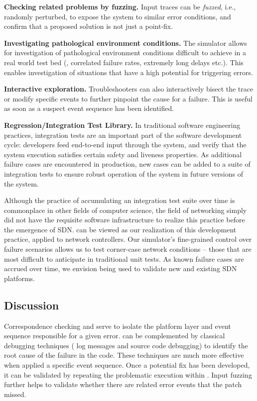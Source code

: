 \noindent\textbf{Checking related problems by fuzzing.} Input traces can be \emph{fuzzed}, i.e.,
randomly perturbed, to expose the system to similar error conditions, and confirm
that a proposed solution is not just a point-fix.

\noindent\textbf{Investigating pathological environment conditions.} The simulator allows for investigation
of pathological environment conditions difficult to achieve in a real world test bed
(\eg{}, correlated failure rates, extremely long delays etc.). This enables
investigation of situations that have a high potential for triggering errors.

\noindent\textbf{Interactive exploration.} Troubleshooters can also interactively bisect
the trace or modify specific events to further pinpoint the cause for a failure.
This is useful as soon as a suspect event sequence has been identified.

\noindent\textbf{Regression/Integration Test Library.} In traditional software engineering practices,
integration tests are an
important part of the software development cycle: developers feed end-to-end
input through the system, and verify that the system execution satisfies
certain safety and liveness properties. As additional failure cases are encountered in
production, new cases can be added to a suite of integration tests to
ensure robust operation of the system in future versions of the system.

Although the practice of accumulating an integration test suite over time is
commonplace in other fields of computer science, the field of networking
simply did not have the requisite software infrastructure to realize this practice before the emergence
of SDN. \Simulator{} can be viewed as our realization
of this development practice, applied to network controllers. Our simulator's fine-grained control over
failure scenarios allows us to test corner-case network conditions -- those
that are most difficult to anticipate in traditional unit tests.
As known failure cases are accrued over time, we envision \simulator{} being used to validate
new and existing SDN platforms. 

\subsection{Discussion}

Correspondence checking and \simulator{} serve to isolate the platform layer and
event sequence responsible for a given error. \projectname{} can be
complemented by classical debugging techniques (\eg{} log messages and source
code debugging) to identify the root cause of
the failure in the code. These techniques are much more
effective when applied a specific event sequence. Once a
potential fix has been developed, it can be validated by repeating the
problematic execution within \projectname{}. Input fuzzing further helps to
validate whether there are 
related error events that the patch missed.
